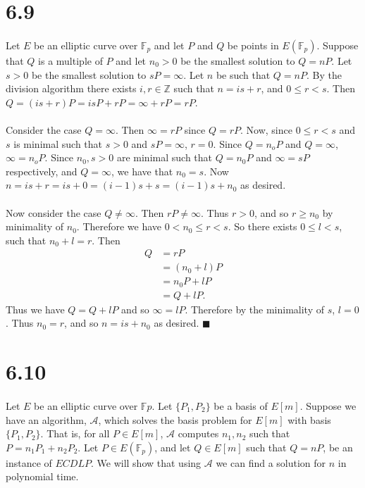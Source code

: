 \documentclass[letterpaper,12pt,oneside,onecolumn]{report}
\begin{document}
\section*{6.9}
\paragraph{}
Let $E$ be an elliptic curve over $\mathbb{F}_p$ and let $P$ and $Q$ be points in $E(\mathbb{F}_p)$. Suppose that $Q$ is a multiple of $P$ and let $n_0 > 0$ be the smallest solution to $Q = nP$. Let $s > 0$ be the smallest solution to $sP = \infty$. Let $n$ be such that $Q = nP$. By the division algorithm there exists $i, r \in \mathbb{Z}$ such that $n= is + r$, and $0 \leq r < s$. Then $Q = (is + r)P = isP + rP = \infty + rP = rP$.
\paragraph{}
Consider the case $Q = \infty$. Then $\infty = rP$ since $Q = rP$. Now, since $0 \leq r < s$ and $s$ is minimal such that $s>0$ and $sP = \infty$, $r = 0$. Since $Q = n_oP$ and $Q = \infty$, $\infty = n_oP$. Since $n_0, s > 0$ are minimal such that $Q = n_0P$ and $\infty = sP$ respectively, and $Q = \infty$, we have that $n_0 = s$. Now $n = is + r = is + 0 = (i-1)s + s = (i-1)s + n_0$ as desired.
\paragraph{}
Now consider the case $Q \neq \infty$. Then $rP \neq \infty$. Thus $r > 0$, and so $r \geq n_0$ by minimality of $n_0$. Therefore we have $0 < n_0 \leq r < s$. So there exists $0 \leq l < s$, such that $n_0 + l = r$. Then
\begin{align*}
Q &= rP \\
&= (n_0 + l)P \\
&= n_0P + lP \\
&= Q + lP.
\end{align*}
Thus we have $Q = Q + lP$ and so $\infty = lP$. Therefore by the minimality of $s$, $l = 0$. Thus $n_0 = r$, and so $n = is + n_0$ as desired. $\blacksquare$
\section*{6.10}
\paragraph{}
Let $E$ be an elliptic curve over $\mathbb{F}p$. Let $\{P_1, P_2\}$ be a basis of $E[m]$. Suppose we have an algorithm, $\mathcal{A}$, which solves the basis problem for $E[m]$ with basis $\{P_1, P_2\}$. That is, for all $P \in E[m]$, $\mathcal{A}$ computes $n_1,n_2$ such that $P = n_1P_1 + n_2P_2$. Let $P \in E(\mathbb{F}_p)$, and let $Q \in E[m]$ such that $Q=nP$, be an instance of $ECDLP$. We will show that using $\mathcal{A}$ we can find  a solution for $n$ in polynomial time.
\end{document}
